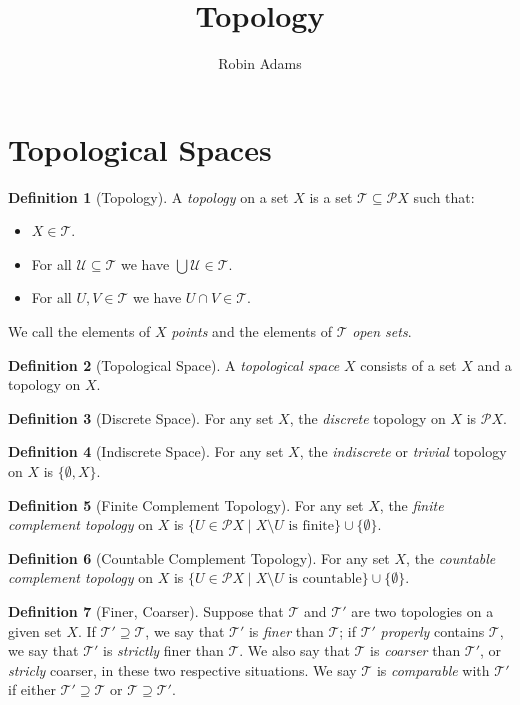 \documentclass{article}
\title{Topology}
\author{Robin Adams}
\theoremstyle{definition}
\newtheorem{df}{Definition}
\newcommand{\pow}{\ensuremath{\mathcal{P}}}
\newcommand{\TT}{\ensuremath{\mathcal{T}}}
\newcommand{\UU}{\ensuremath{\mathcal{U}}}
\begin{document}
\maketitle

\section{Topological Spaces}

\begin{df}[Topology]
    A \emph{topology} on a set $X$ is a set $\TT \subseteq \pow X$ such that:
    \begin{itemize}
        \item $X \in \TT$.
        \item For all $\UU \subseteq \TT$ we have $\bigcup \UU \in \TT$.
        \item For all $U, V \in \TT$ we have $U \cap V \in \TT$.
    \end{itemize}
    We call the elements of $X$ \emph{points} and the elements of $\TT$ \emph{open sets}.
\end{df}

\begin{df}[Topological Space]
    A \emph{topological space} $X$ consists of a set $X$ and a topology on $X$.
\end{df}

\begin{df}[Discrete Space]
    For any set $X$, the \emph{discrete} topology on $X$ is $\pow X$.
\end{df}

\begin{df}[Indiscrete Space]
    For any set $X$, the \emph{indiscrete} or \emph{trivial} topology on $X$ is $\{ \emptyset, X \}$.
\end{df}

\begin{df}[Finite Complement Topology]
    For any set $X$, the \emph{finite complement topology} on $X$ is $\{ U \in \pow X \mid X \setminus U \text{ is finite} \} 
    \cup \{ \emptyset \}$.
\end{df}

\begin{df}[Countable Complement Topology]
    For any set $X$, the \emph{countable complement topology} on $X$ is $\{ U \in \pow X \mid X \setminus U \text{ is countable} \} 
    \cup \{ \emptyset \}$.
\end{df}

\begin{df}[Finer, Coarser]
    Suppose that $\TT$ and $\TT'$ are two topologies on a given set $X$. If $\TT' \supseteq \TT$, we say that $\TT'$ is \emph{finer} than
    $\TT$; if $\TT'$ \emph{properly} contains $\TT$, we say that $\TT'$ is \emph{strictly} finer than $\TT$. We also say that $\TT$ is
    \emph{coarser} than $\TT'$, or \emph{stricly} coarser, in these two respective situations. We say $\TT$ is \emph{comparable} with
    $\TT'$ if either $\TT' \supseteq \TT$ or $\TT \supseteq \TT'$.
\end{df}
\end{document}
